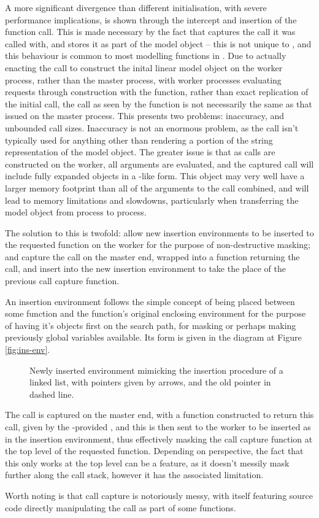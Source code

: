 A more significant divergence than different initialisation, with severe performance implications, is shown through the intercept and insertion of the function call.
This is made necessary by the fact that  captures the call it was called with, and stores it as part of the model object -- this is not unique to , and this behaviour is common to most modelling functions in \R{}.
Due to actually enacting the call to construct the inital  linear model object on the worker process, rather than the master process, with worker processes evaluating requests through construction with the  function, rather than exact replication of the initial call, the call as seen by the function is not necessarily the same as that issued on the master process.
This presents two problems: inaccuracy, and unbounded call sizes.
Inaccuracy is not an enormous problem, as the call isn't typically used for anything other than rendering a portion of the string representation of the model object.
The greater issue is that as calls are constructed on the worker, all arguments are evaluated, and the captured call will include fully expanded objects in a -like form.
This object may very well have a larger memory footprint than all of the arguments to the call combined, and will lead to memory limitations and slowdowns, particularly when transferring the model object from process to process.

The solution to this is twofold: allow new insertion environments to be inserted to the requested function on the worker for the purpose of non-destructive masking; and capture the call on the master end, wrapped into a function returning the call, and insert into the new insertion environment to take the place of the previous call capture function.

An insertion environment follows the simple concept of being placed between some function and the function's original enclosing environment for the purpose of having it's objects first on the search path, for masking or perhaps making previously global variables available.
Its form is given in the diagram at Figure \cref{fig:ins-env}.

\begin{figure}

\caption{Newly inserted environment mimicking the insertion procedure of a linked list, with pointers given by arrows, and the old pointer in dashed line.}
\end{figure}


The call is captured on the master end, with a function constructed to return this call, given by the \lsr{}-provided , and this is then sent to the worker to be inserted as  in the insertion environment, thus effectively masking the call capture function at the top level of the requested  function.
Depending on perspective, the fact that this only works at the top level can be a feature, as it doesn't messily mask further along the call stack, however it has the associated limitation.

Worth noting is that call capture is notoriously messy, with  itself featuring source code directly manipulating the call as part of some functions.

